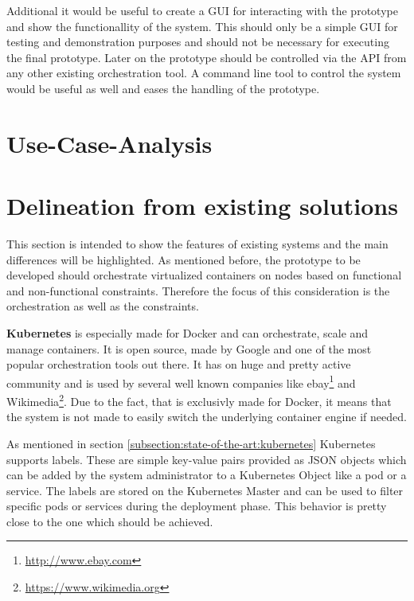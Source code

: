 Additional it would be useful to create a \ac{GUI} for interacting with the prototype and show the functionallity of the system.
This should only be a simple \ac{GUI} for testing and demonstration purposes and should not be necessary for executing the final prototype.
Later on the prototype should be controlled via the \ac{API} from any other existing orchestration tool.
A command line tool to control the system would be useful as well and eases the handling of the prototype.

\section{Use-Case-Analysis}
\label{section:use-case-analysis}
\doit

\section{Delineation from existing solutions}
\label{section:delineation-from-existing-solutions}
This section is intended to show the features of existing systems and the main differences will be highlighted.
As mentioned before, the prototype to be developed should orchestrate virtualized containers on nodes based on functional and non-functional constraints.
Therefore the focus of this consideration is the orchestration as well as the constraints.

\textbf{Kubernetes} is especially made for Docker and can orchestrate, scale and manage containers.
It is open source, made by Google and one of the most popular orchestration tools out there.
It has on huge and pretty active community and is used by several well known companies\autocite{Kubernetes:Case-Studies} like ebay\footnote{\url{http://www.ebay.com}} and Wikimedia\footnote{\url{https://www.wikimedia.org}}.
Due to the fact, that is exclusivly made for Docker, it means that the system is not made to easily switch the underlying container engine if needed.

As mentioned in section \ref{subsection:state-of-the-art:kubernetes} Kubernetes supports labels.
These are simple key-value pairs provided as \ac{JSON} objects which can be added by the system administrator to a Kubernetes Object like a pod or a service.
The labels are stored on the Kubernetes Master and can be used to filter specific pods or services during the deployment phase.
This behavior is pretty close to the one which should be achieved.

